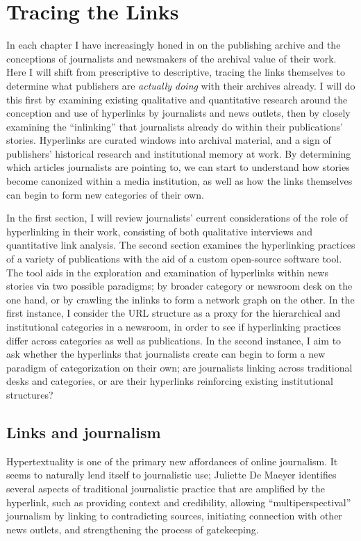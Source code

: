 \chapter{Tracing the Links}

In each chapter I have increasingly honed in on the publishing archive and the conceptions of journalists and newsmakers of the archival value of their work. Here I will shift from prescriptive to descriptive, tracing the links themselves to determine what publishers are \emph{actually doing} with their archives already. I will do this first by examining existing qualitative and quantitative research around the conception and use of hyperlinks by journalists and news outlets, then by closely examining the ``inlinking'' that journalists already do within their publications' stories. Hyperlinks are curated windows into archival material, and a sign of publishers' historical research and institutional memory at work. By determining which articles journalists are pointing to, we can start to understand how stories become canonized within a media institution, as well as how the links themselves can begin to form new categories of their own.

In the first section, I will review journalists' current considerations of the role of hyperlinking in their work, consisting of both qualitative interviews and quantitative link analysis. The second section examines the hyperlinking practices of a variety of publications with the aid of a custom open-source software tool. The tool aids in the exploration and examination of hyperlinks within news stories via two possible paradigms; by broader category or newsroom desk on the one hand, or by crawling the inlinks to form a network graph on the other. In the first instance, I consider the URL structure as a proxy for the hierarchical and institutional categories in a newsroom, in order to see if hyperlinking practices differ across categories as well as publications. In the second instance, I aim to ask whether the hyperlinks that journalists create can begin to form a new paradigm of categorization on their own; are journalists linking across traditional desks and categories, or are their hyperlinks reinforcing existing institutional structures?

\section{Links and journalism}

Hypertextuality is one of the primary new affordances of online journalism.\autocites[See][]{deuze_web_2003}{de_maeyer_towards_2013}{oblak_lack_2005} It seems to naturally lend itself to journalistic use; Juliette De Maeyer identifies several aspects of traditional journalistic practice that are amplified by the hyperlink, such as providing context and credibility, allowing ``multiperspectival'' journalism by linking to contradicting sources, initiating connection with other news outlets, and strengthening the process of gatekeeping.\autocite[9-10]{de_maeyer_methods_2010}

